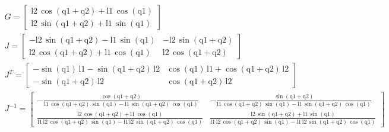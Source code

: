 \documentclass[11pt]{amsart}
\begin{document}
\begin{align}
\label{ }
G=\left[\begin{array}{c} \mathrm{l2}\, \cos\!\left(\mathrm{q1} + \mathrm{q2}\right) + \mathrm{l1}\, \cos\!\left(\mathrm{q1}\right)\\ \mathrm{l2}\, \sin\!\left(\mathrm{q1} + \mathrm{q2}\right) + \mathrm{l1}\, \sin\!\left(\mathrm{q1}\right) \end{array}\right] \\
J=\left[\begin{array}{cc}  - \mathrm{l2}\, \sin\!\left(\mathrm{q1} + \mathrm{q2}\right) - \mathrm{l1}\, \sin\!\left(\mathrm{q1}\right) & - \mathrm{l2}\, \sin\!\left(\mathrm{q1} + \mathrm{q2}\right)\\ \mathrm{l2}\, \cos\!\left(\mathrm{q1} + \mathrm{q2}\right) + \mathrm{l1}\, \cos\!\left(\mathrm{q1}\right) & \mathrm{l2}\, \cos\!\left(\mathrm{q1} + \mathrm{q2}\right) \end{array}\right] \\
J^T=\left[\begin{array}{cc}  - \sin\!\left(\mathrm{q1}\right)\, \mathrm{l1} - \sin\!\left(\mathrm{q1} + \mathrm{q2}\right)\, \mathrm{l2} & \cos\!\left(\mathrm{q1}\right)\, \mathrm{l1} + \cos\!\left(\mathrm{q1} + \mathrm{q2}\right)\, \mathrm{l2}\\ - \sin\!\left(\mathrm{q1} + \mathrm{q2}\right)\, \mathrm{l2} & \cos\!\left(\mathrm{q1} + \mathrm{q2}\right)\, \mathrm{l2} \end{array}\right] \\
J^{-1}=\left[\begin{array}{cc} -\frac{\cos\!\left(\mathrm{q1} + \mathrm{q2}\right)}{\mathrm{l1}\, \cos\!\left(\mathrm{q1} + \mathrm{q2}\right)\, \sin\!\left(\mathrm{q1}\right) - \mathrm{l1}\, \sin\!\left(\mathrm{q1} + \mathrm{q2}\right)\, \cos\!\left(\mathrm{q1}\right)} & -\frac{\sin\!\left(\mathrm{q1} + \mathrm{q2}\right)}{\mathrm{l1}\, \cos\!\left(\mathrm{q1} + \mathrm{q2}\right)\, \sin\!\left(\mathrm{q1}\right) - \mathrm{l1}\, \sin\!\left(\mathrm{q1} + \mathrm{q2}\right)\, \cos\!\left(\mathrm{q1}\right)}\\ \frac{\mathrm{l2}\, \cos\!\left(\mathrm{q1} + \mathrm{q2}\right) + \mathrm{l1}\, \cos\!\left(\mathrm{q1}\right)}{\mathrm{l1}\, \mathrm{l2}\, \cos\!\left(\mathrm{q1} + \mathrm{q2}\right)\, \sin\!\left(\mathrm{q1}\right) - \mathrm{l1}\, \mathrm{l2}\, \sin\!\left(\mathrm{q1} + \mathrm{q2}\right)\, \cos\!\left(\mathrm{q1}\right)} & \frac{\mathrm{l2}\, \sin\!\left(\mathrm{q1} + \mathrm{q2}\right) + \mathrm{l1}\, \sin\!\left(\mathrm{q1}\right)}{\mathrm{l1}\, \mathrm{l2}\, \cos\!\left(\mathrm{q1} + \mathrm{q2}\right)\, \sin\!\left(\mathrm{q1}\right) - \mathrm{l1}\, \mathrm{l2}\, \sin\!\left(\mathrm{q1} + \mathrm{q2}\right)\, \cos\!\left(\mathrm{q1}\right)} \end{array}\right] \\

\end{align}
\end{document}
